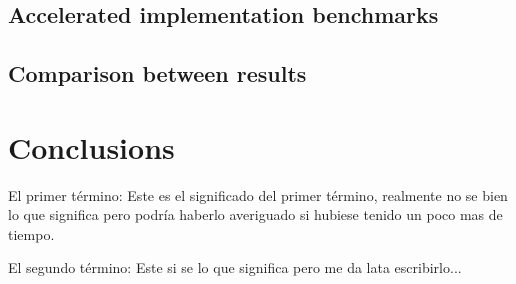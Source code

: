 \documentclass{iccmemoria}
\begin{document}
\section{Accelerated implementation benchmarks}
\section{Comparison between results}

\chapter{Conclusions}





\begin{glosario}
  \item[El primer término:] Este es el significado del primer término, realmente no se bien lo que significa pero podría haberlo averiguado si hubiese tenido un poco mas de tiempo.
  \item[El segundo término:] Este si se lo que significa pero me da lata escribirlo...
\end{glosario}
\end{document}
